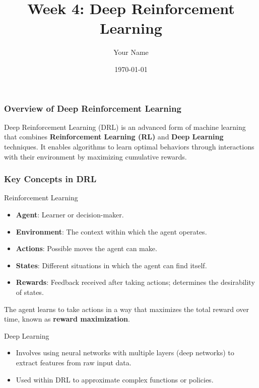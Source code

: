 \documentclass{beamer}
\title{Week 4: Deep Reinforcement Learning}
\author{Your Name}
\institute{Your Institution}
\date{\today}
\begin{document}
\frame{\titlepage}

\begin{frame}[fragile]
    \titlepage
\end{frame}

\begin{frame}[fragile]
    \frametitle{Overview of Deep Reinforcement Learning}
    Deep Reinforcement Learning (DRL) is an advanced form of machine learning that combines \textbf{Reinforcement Learning (RL)} and \textbf{Deep Learning} techniques. It enables algorithms to learn optimal behaviors through interactions with their environment by maximizing cumulative rewards.
\end{frame}

\begin{frame}[fragile]
    \frametitle{Key Concepts in DRL}
    \begin{block}{Reinforcement Learning}
        \begin{itemize}
            \item \textbf{Agent}: Learner or decision-maker.
            \item \textbf{Environment}: The context within which the agent operates.
            \item \textbf{Actions}: Possible moves the agent can make.
            \item \textbf{States}: Different situations in which the agent can find itself.
            \item \textbf{Rewards}: Feedback received after taking actions; determines the desirability of states.
        \end{itemize}
        The agent learns to take actions in a way that maximizes the total reward over time, known as \textbf{reward maximization}.
    \end{block}
    
    \begin{block}{Deep Learning}
        \begin{itemize}
            \item Involves using neural networks with multiple layers (deep networks) to extract features from raw input data.
            \item Used within DRL to approximate complex functions or policies.
        \end{itemize}
    \end{block}
\end{frame}
\end{document}
